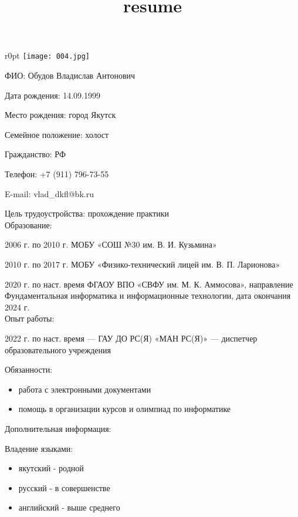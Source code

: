 \documentclass[a4paper,12pt]{article}
\title{resume}
\begin{document}
\begin{wrapfigure}{r}{0pt}
    \texttt{[image: 004.jpg]}
\end{wrapfigure}

\begin{center}
    {}
\end{center}



ФИО: Обудов Владислав Антонович

Дата рождения: 14.09.1999

Место рождения: город Якутск

Семейное положение: холост

Гражданство: РФ

Телефон: +7 (911) 796-73-55

E-mail: vlad\_dkfl@bk.ru

Цель трудоустройства: прохождение практики\\

Образование:

2006 г. по 2010 г. МОБУ «СОШ №30 им. В. И. Кузьмина»

2010 г. по 2017 г. МОБУ «Физико-технический лицей им. В. П. Ларионова»

2020 г. по наст. время ФГАОУ ВПО «СВФУ им. М. К. Аммосова», направление Фундаментальная информатика и информационные технологии, дата окончания 2024 г.\\

Опыт работы:

2022 г. по наст. время --- ГАУ ДО РС(Я) «МАН РС(Я)» --- диспетчер образовательного учреждения

Обязанности:
\begin{itemize}[noitemsep,topsep=0pt,parsep=0pt,partopsep=0pt]
    \item работа с электронными документами
    \item помощь в организации курсов и олимпиад по информатике\\
\end{itemize}

Дополнительная информация:

Владение языками:

\begin{itemize}[noitemsep,topsep=0pt,parsep=0pt,partopsep=0pt]
    \item якутский - родной
    \item русский - в совершенстве
    \item английский - выше среднего
\end{itemize}
\end{document}
